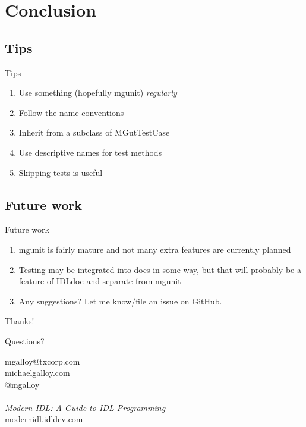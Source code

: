 \documentclass[12pt, handout]{beamer}
\begin{document}
\section{Conclusion}

\subsection{Tips}
\begin{frame}[t]{Tips}
  \begin{enumerate}
    \item Use something (hopefully mgunit) {\em regularly}
    \item Follow the name conventions
    \item Inherit from a subclass of MGutTestCase
    \item Use descriptive names for test methods
    \item Skipping tests is useful
  \end{enumerate}
\end{frame}

\subsection{Future work}
\begin{frame}[t]{Future work}
  \begin{enumerate}
    \item mgunit is fairly mature and not many extra features are currently planned
    \item Testing may be integrated into docs in some way, but that will probably be a feature of IDLdoc and separate from mgunit
    \item Any suggestions? Let me know/file an issue on GitHub.
  \end{enumerate}
\end{frame}

\begin{frame}{Thanks!}
  \begin{center}

{\huge Questions?} \\

\bigskip

{mgalloy@txcorp.com} \\
{michaelgalloy.com} \\
{@mgalloy} \\
~\\
{\em Modern IDL: A Guide to IDL Programming} \\
{modernidl.idldev.com} \\


\end{center}
\end{frame}
\end{document}

